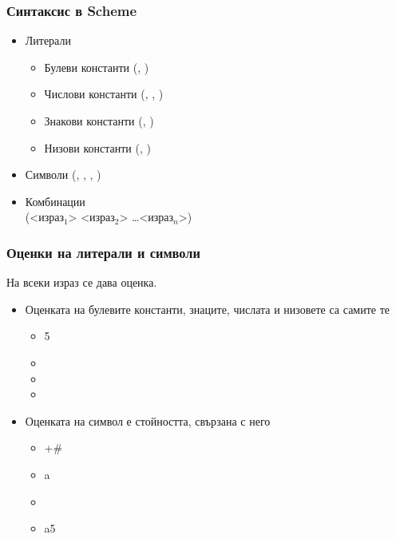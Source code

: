 \documentclass[alsotrans,beameroptions={aspectratio=169}]{beamerswitch}
\begin{document}
\begin{frame}[fragile]
  \frametitle{Синтаксис в Scheme}

  \begin{itemize}[<+->]
  \item Литерали
    \begin{itemize}
    \item Булеви константи (, )
    \item Числови константи (, , )
    \item Знакови константи (\lst{#\a}, \lst{#\newline})
    \item Низови константи (, )
    \end{itemize}
  \item Символи (, , \lst{+}, )
  \item Комбинации\\[2ex]
    \alert({}<израз$_1$> <израз$_2$> \ldots <израз$_n$>\alert)
  \end{itemize}
\end{frame}

\begin{frame}[fragile]
  \frametitle{Оценки на литерали и символи}

  На всеки израз се дава оценка.
  \begin{itemize}[<+->]
  \item Оценката на булевите константи, знаците, числата и низовете са самите те
    \begin{itemize}
    \item {} 5
    \item {}
    \item \evalsto{\#\\a}{\#\\a}
    \item {}
    \end{itemize}
  \item Оценката на символ е стойността, свързана с него
    \begin{itemize}
    \item \evalsto +{\#<procedure:+>}
    \item \evalstoerr a
    \item {}
    \item \evalsto a5
    \end{itemize}
  \end{itemize}
\end{frame}
\end{document}
